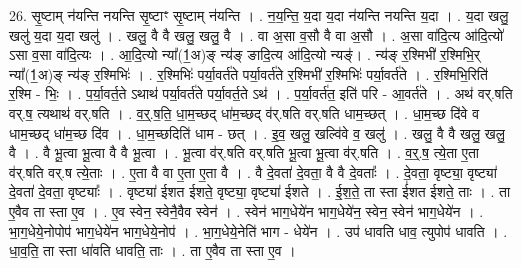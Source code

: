 \documentclass[17pt]{extarticle}
\begin{document}
26. सृ॒ष्टाम् न॑यन्ति नयन्ति सृ॒ष्टाꣳ सृ॒ष्टाम् न॑यन्ति । . न॒य॒न्ति॒ य॒दा य॒दा न॑यन्ति नयन्ति य॒दा । . य॒दा खलु॒ खलु॑ य॒दा य॒दा खलु॑ । . खलु॒ वै वै खलु॒ खलु॒ वै । . वा अ॒सा व॒सौ वै वा अ॒सौ । . अ॒सा वा॑दि॒त्य आ॑दि॒त्यो॑ ऽसा व॒सा वा॑दि॒त्यः । . आ॒दि॒त्यो न्या᳚(1॒अ)ङ् न्य॑ङ् ङादि॒त्य आ॑दि॒त्यो न्यङ्॑। . न्य॑ङ् र॒श्मिभी॑ र॒श्मिभि॒र् न्या᳚(1॒अ)ङ् न्य॑ङ् र॒श्मिभिः॑ । . र॒श्मिभिः॑ पर्या॒वर्त॑ते पर्या॒वर्त॑ते र॒श्मिभी॑ र॒श्मिभिः॑ पर्या॒वर्त॑ते । . र॒श्मिभि॒रिति॑ र॒श्मि - भिः॒ । . प॒र्या॒वर्त॒ते ऽथाथ॑ पर्या॒वर्त॑ते पर्या॒वर्त॒ते ऽथ॑ । . प॒र्या॒वर्त॑त॒ इति॑ परि - आ॒वर्त॑ते । . अथ॑ वर्.षति वर्.ष॒ त्यथाथ॑ वर्.षति । . व॒र्॒.ष॒ति॒ धा॒म॒च्छद् धा॑म॒च्छद् व॑र्.षति वर्.षति धाम॒च्छत् । . धा॒म॒च्छ दि॑वे व धाम॒च्छद् धा॑म॒च्छ दि॑व । . धा॒म॒च्छदिति॑ धाम - छत् । . इ॒व॒ खलु॒ खल्वि॑वे व॒ खलु॑ । . खलु॒ वै वै खलु॒ खलु॒ वै । . वै भू॒त्वा भू॒त्वा वै वै भू॒त्वा । . भू॒त्वा व॑र्.षति वर्.षति भू॒त्वा भू॒त्वा व॑र्.षति । . व॒र्॒.ष॒ त्ये॒ता ए॒ता व॑र्.षति वर्.ष त्ये॒ताः । . ए॒ता वै वा ए॒ता ए॒ता वै । . वै दे॒वता॑ दे॒वता॒ वै वै दे॒वताः᳚ । . दे॒वता॒ वृष्ट्या॒ वृष्ट्या॑ दे॒वता॑ दे॒वता॒ वृष्ट्याः᳚ । . वृष्ट्या॑ ईशत ईशते॒ वृष्ट्या॒ वृष्ट्या॑ ईशते । . ई॒श॒ते॒ ता स्ता ई॑शत ईशते॒ ताः । . ता ए॒वैव ता स्ता ए॒व । . ए॒व स्वेन॒ स्वेनै॒वैव स्वेन॑ । . स्वेन॑ भाग॒धेये॑न भाग॒धेये॑न॒ स्वेन॒ स्वेन॑ भाग॒धेये॑न । . भा॒ग॒धेये॒नोपोप॑ भाग॒धेये॑न भाग॒धेये॒नोप॑ । . भा॒ग॒धेये॒नेति॑ भाग - धेये॑न । . उप॑ धावति धाव॒ त्युपोप॑ धावति । . धा॒व॒ति॒ ता स्ता धा॑वति धावति॒ ताः । . ता ए॒वैव ता स्ता ए॒व । \newline
\end{document}
